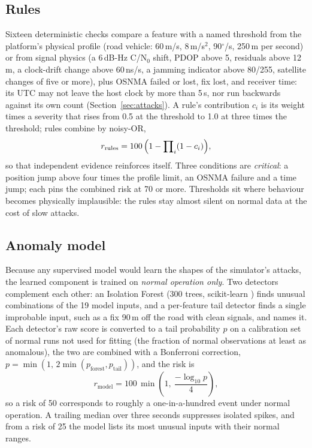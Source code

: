 \documentclass[conference]{IEEEtran}
\begin{document}
\subsection{Rules}
Sixteen deterministic checks compare a feature with a named threshold from the platform's physical profile (road vehicle: 60\,m/s, 8\,m/s$^2$, 90$^\circ$/s, 250\,m per second) or from signal physics (a 6\,dB-Hz C/N$_0$ shift, PDOP above 5, residuals above 12\,m, a clock-drift change above 60\,ns/s, a jamming indicator above 80/255, satellite changes of five or more), plus OSNMA failed or lost, fix lost, and receiver time: its UTC may not leave the host clock by more than 5\,s, nor run backwards against its own count (Section~\ref{sec:attacks}). A rule's contribution $c_i$ is its weight times a severity that rises from 0.5 at the threshold to 1.0 at three times the threshold; rules combine by noisy-OR,
\begin{equation}
r_{\mathrm{rules}} = 100\,\Bigl(1-\prod\nolimits_i (1-c_i)\Bigr),
\label{eq:rules}
\end{equation}
so that independent evidence reinforces itself. Three conditions are \emph{critical}: a position jump above four times the profile limit, an OSNMA failure and a time jump; each pins the combined risk at 70 or more. Thresholds sit where behaviour becomes physically implausible: the rules stay almost silent on normal data at the cost of slow attacks.

\subsection{Anomaly model}
Because any supervised model would learn the shapes of the simulator's attacks, the learned component is trained on \emph{normal operation only}. Two detectors complement each other: an Isolation Forest \cite{liu2008} (300 trees, scikit-learn \cite{sklearn}) finds unusual combinations of the 19 model inputs, and a per-feature tail detector finds a single improbable input, such as a fix 90\,m off the road with clean signals, and names it. Each detector's raw score is converted to a tail probability $p$ on a calibration set of normal runs not used for fitting (the fraction of normal observations at least as anomalous), the two are combined with a Bonferroni correction, $p=\min(1,\,2\min(p_{\mathrm{forest}},p_{\mathrm{tail}}))$, and the risk is
\begin{equation}
r_{\mathrm{model}} = 100\,\min\!\left(1,\ \frac{-\log_{10} p}{4}\right),
\label{eq:model}
\end{equation}
so a risk of 50 corresponds to roughly a one-in-a-hundred event under normal operation. A trailing median over three seconds suppresses isolated spikes, and from a risk of 25 the model lists its most unusual inputs with their normal ranges.
\end{document}
